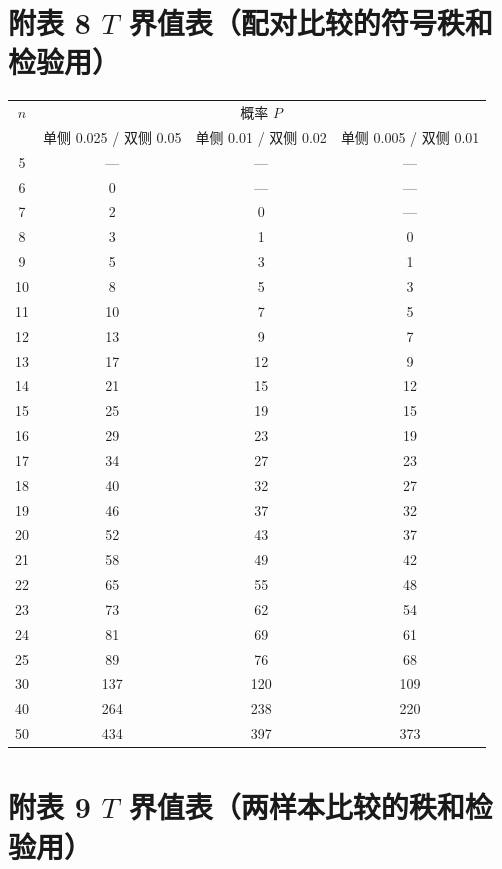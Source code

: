 \documentclass[lang=cn,10pt]{elegantbook}
\begin{document}
\newpage

\section{附表 8 $T$ 界值表（配对比较的符号秩和检验用）}
\begin{longtable}{c|ccc}
    \hline
    $n$ & \multicolumn{3}{c}{概率 $P$} \\
    & 单侧 0.025 / 双侧 0.05 & 单侧 0.01 / 双侧 0.02 & 单侧 0.005 / 双侧 0.01 \\
    \hline
    \endhead
    5  & — & — & — \\
    6  & 0 & — & — \\
    7  & 2 & 0 & — \\
    8  & 3 & 1 & 0 \\
    9  & 5 & 3 & 1 \\
    10 & 8 & 5 & 3 \\
    11 & 10 & 7 & 5 \\
    12 & 13 & 9 & 7 \\
    13 & 17 & 12 & 9 \\
    14 & 21 & 15 & 12 \\
    15 & 25 & 19 & 15 \\
    16 & 29 & 23 & 19 \\
    17 & 34 & 27 & 23 \\
    18 & 40 & 32 & 27 \\
    19 & 46 & 37 & 32 \\
    20 & 52 & 43 & 37 \\
    21 & 58 & 49 & 42 \\
    22 & 65 & 55 & 48 \\
    23 & 73 & 62 & 54 \\
    24 & 81 & 69 & 61 \\
    25 & 89 & 76 & 68 \\
    30 & 137 & 120 & 109 \\
    40 & 264 & 238 & 220 \\
    50 & 434 & 397 & 373 \\
    \hline
\end{longtable}

\newpage

\section{附表 9 $T$ 界值表（两样本比较的秩和检验用）}
\end{document}
